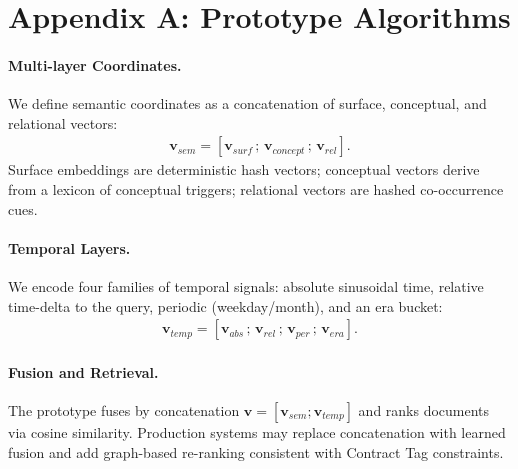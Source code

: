 
\section*{Appendix A: Prototype Algorithms}
\paragraph{Multi-layer Coordinates.}
We define semantic coordinates as a concatenation of surface, conceptual, and relational vectors:
\begin{align}
\mathbf{v}_{sem} = [\mathbf{v}_{surf} \, ; \, \mathbf{v}_{concept} \, ; \, \mathbf{v}_{rel}].
\end{align}
Surface embeddings are deterministic hash vectors; conceptual vectors derive from a lexicon of
conceptual triggers; relational vectors are hashed co-occurrence cues.

\paragraph{Temporal Layers.}
We encode four families of temporal signals:
absolute sinusoidal time, relative time-delta to the query, periodic (weekday/month),
and an era bucket:
\begin{align}
\mathbf{v}_{temp} = [\mathbf{v}_{abs} \, ; \, \mathbf{v}_{rel} \, ; \, \mathbf{v}_{per} \, ; \, \mathbf{v}_{era}].
\end{align}

\paragraph{Fusion and Retrieval.}
The prototype fuses by concatenation
$\mathbf{v} = [\mathbf{v}_{sem};\mathbf{v}_{temp}]$
and ranks documents via cosine similarity.
Production systems may replace concatenation with learned fusion and add
graph-based re-ranking consistent with Contract Tag constraints.
